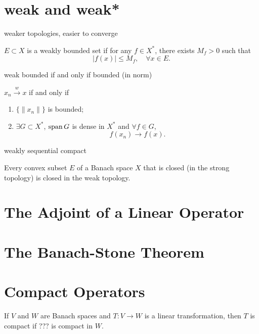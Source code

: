 \section{weak and weak*}

weaker topologies, easier to converge 

\begin{definition}
    $E\subset X$ is a weakly bounded set if 
    for any $f\in X^*$, there exists $M_f>0$ such that 
    $$ |f(x)|\leq M_f,\quad \forall x\in E. $$
\end{definition}

\begin{theorem}
    weak bounded if and only if bounded (in norm)
\end{theorem}

\begin{theorem}
    $x_n\overset{w}{\to} x$ if and only if 
    \begin{enumerate}[label=(\roman*)]
        \item $\{\|x_n\|\}$ is bounded;
        \item $\exists G\subset X^*$, $\operatorname{span} G$ is dense in $X^*$ and $\forall f\in G$, $$f(x_n)\to f(x).$$
    \end{enumerate}
\end{theorem}

weakly sequential compact

\begin{theorem}
    Every convex subset $E$ of a Banach space $X$ that is closed (in the strong topology) is closed in the weak topology.
\end{theorem}

\section{The Adjoint of a Linear Operator}


\section{The Banach-Stone Theorem}



\section{Compact Operators}
\begin{definition}
    If $V$ and $W$ are Banach spaces and $T:V\to W$ is a linear transformation,
    then $T$ is compact if ??? is compact in $W$.
\end{definition}
